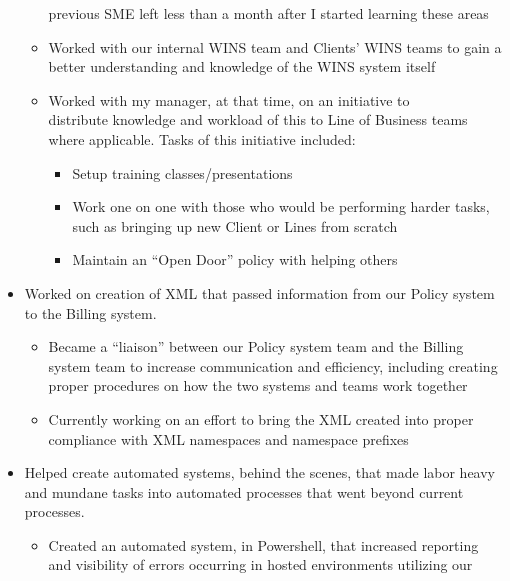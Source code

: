 \documentclass[margin]{res}
\begin{document}
\begin{resume}
\begin{itemize}
\begin{itemize}
               previous SME left less than a month after I started learning these areas
            \item Worked with our internal WINS team and Clients' WINS teams to gain a 
               better understanding and knowledge of the WINS system itself
            \item Worked with my manager, at that time, on an initiative to \\
            distribute 
               knowledge and workload of this to Line of Business teams where 
               applicable. 
               Tasks of this initiative included:
               \begin{itemize}
                  \item Setup training classes/presentations 
                  \item Work one on one with those who would be performing harder tasks, 
                     such as bringing up new Client or Lines from scratch
                  \item Maintain an ``Open Door'' policy with helping others
               \end{itemize}
         \end{itemize}
      \item Worked on creation of XML that passed information from our Policy system 
         to the Billing system.
         \begin{itemize}
            \item Became a ``liaison'' between our Policy system team and the Billing 
               system team to increase communication and efficiency, including creating 
               proper procedures on how the two systems and teams work together
            \item Currently working on an effort to bring the XML created into proper \\
               compliance with XML namespaces and namespace prefixes
         \end{itemize}
      \item Helped create automated systems, behind the scenes, that made labor heavy 
         and mundane tasks into automated processes that went beyond current \\
         processes.
         \begin{itemize}
            \item Created an automated system, in Powershell, that increased reporting 
               and visibility of errors occurring in hosted environments utilizing our 

\end{itemize}
\end{itemize}
\end{resume}
\end{document}
